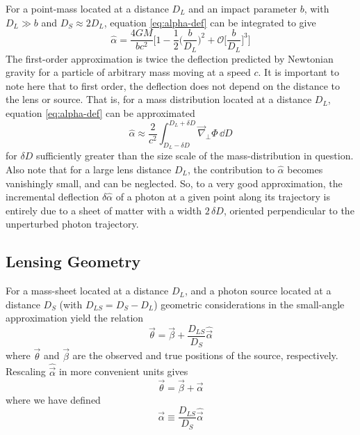 For a point-mass located at a distance $D_L$ and an impact parameter $b$, with $D_L \gg b$ and $D_S \approx 2D_L$, equation \ref{eq:alpha-def} can be integrated to give
\begin{equation}
  \hat{\alpha} = \frac{4GM}{bc^2}\Bigg[1 - \frac{1}{2}\bigg(\frac{b}{D_L}\bigg)^2 + \mathcal{O}\bigg[\frac{b}{D_L}\bigg]^3 \Bigg]
\end{equation}
The first-order approximation is twice the deflection predicted by Newtonian gravity for a particle of arbitrary mass moving at a speed $c$.  It is important to note here that to first order, the deflection does not depend on the distance to the lens or source.  That is, for a mass distribution located at a distance $D_L$, equation \ref{eq:alpha-def} can be approximated
\begin{equation}
  \label{eq:alpha-def-approx}
  \hat{\alpha} \approx \frac{2}{c^2}\int_{D_L-\delta D}^{D_L+\delta D} \vec{\nabla}_\perp\Phi\,\dd D
\end{equation}
for $\delta D$ sufficiently greater than the size scale of the mass-distribution in question.  Also note that for a large lens distance $D_L$, the contribution to $\hat{\alpha}$ becomes vanishingly small, and can be neglected.  So, to a very good approximation, the incremental deflection $\delta \hat{\alpha}$ of a photon at a given point along its trajectory is entirely due to a sheet of matter with a width $2\,\delta D$, oriented perpendicular to the unperturbed photon trajectory.  

\subsection{Lensing Geometry}

For a mass-sheet located at a distance $D_L$, and a photon source located at a distance $D_S$ (with $D_{LS} = D_S - D_L$) geometric considerations in the small-angle approximation yield the relation
\begin{equation}
  \vec{\theta} = \vec{\beta} + \frac{D_{LS}}{D_S}\hat{\vec{\alpha}}
\end{equation}
where $\vec{\theta}$ and $\vec{\beta}$ are the observed and true positions of the source, respectively.  Rescaling $\hat{\vec{\alpha}}$ in more convenient units gives
\begin{equation}
  \label{eq:mapping}
  \vec{\theta} = \vec{\beta} + \vec{\alpha}
\end{equation}
where we have defined
\begin{equation}
  \label{eq:alpha-def2}
  \vec{\alpha} \equiv \frac{D_{LS}}{D_S}\hat{\vec{\alpha}}
\end{equation}

